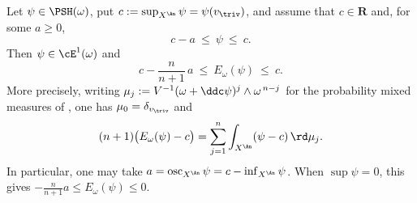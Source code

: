 \begin{lemma}
\label{lem:ch49-truncation-energy}
Let \(\psi\in\PSH(\omega)\), put
\(c:=\sup_{X^{\An}}\psi=\psi(v_{\triv})\), and assume that
\(c\in\mathbf R\) and, for some \(a\ge0\),
\[
                         c-a\ \le\ \psi\ \le\ c.
\]
Then \(\psi\in\cE^1(\omega)\) and
\[
 c-\frac{n}{n+1}\,a\ \le\ E_\omega(\psi)\ \le\ c .
\]
More precisely, writing
\(\mu_j:=V^{-1}(\omega+\ddc\psi)^j\wedge\omega^{\,n-j}\) for the
probability mixed measures of , one has
\(\mu_0=\delta_{v_{\triv}}\) and
\[
 (n+1)\bigl(E_\omega(\psi)-c\bigr)
 =\sum_{j=1}^{n}\int_{X^{\An}}(\psi-c)\,\rd\mu_j .
\]
In particular, one may take
\(a=\operatorname{osc}_{X^{\An}}\psi=c-\inf_{X^{\An}}\psi\).  When
\(\sup\psi=0\), this gives
\(-\frac{n}{n+1}a\le E_\omega(\psi)\le0\).
\end{lemma}

